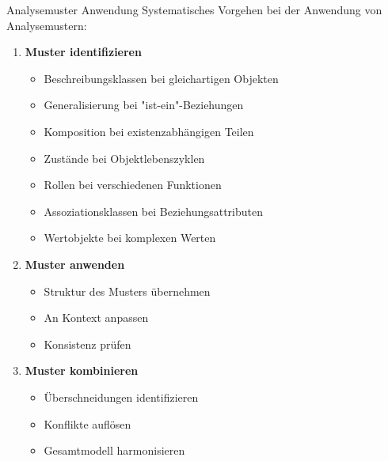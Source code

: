 \begin{KR}{Analysemuster Anwendung}
Systematisches Vorgehen bei der Anwendung von Analysemustern:
\begin{enumerate}
    \item \textbf{Muster identifizieren}
    \begin{itemize}
        \item Beschreibungsklassen bei gleichartigen Objekten
        \item Generalisierung bei "ist-ein"-Beziehungen
        \item Komposition bei existenzabhängigen Teilen
        \item Zustände bei Objektlebenszyklen
        \item Rollen bei verschiedenen Funktionen
        \item Assoziationsklassen bei Beziehungsattributen
        \item Wertobjekte bei komplexen Werten
    \end{itemize}
    
    \item \textbf{Muster anwenden}
    \begin{itemize}
        \item Struktur des Musters übernehmen
        \item An Kontext anpassen
        \item Konsistenz prüfen
    \end{itemize}
    
    \item \textbf{Muster kombinieren}
    \begin{itemize}
        \item Überschneidungen identifizieren
        \item Konflikte auflösen
        \item Gesamtmodell harmonisieren
    \end{itemize}
\end{enumerate}
\end{KR}

